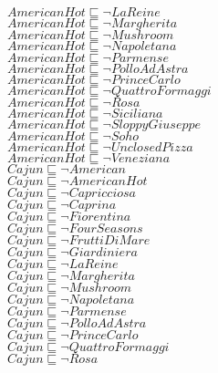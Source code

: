 \documentclass[a4paper,10pt]{article}
\begin{document}
 $AmericanHot \sqsubseteq  \lnot LaReine$\\ 
 $AmericanHot \sqsubseteq  \lnot Margherita$\\ 
 $AmericanHot \sqsubseteq  \lnot Mushroom$\\ 
 $AmericanHot \sqsubseteq  \lnot Napoletana$\\ 
 $AmericanHot \sqsubseteq  \lnot Parmense$\\ 
 $AmericanHot \sqsubseteq  \lnot PolloAdAstra$\\ 
 $AmericanHot \sqsubseteq  \lnot PrinceCarlo$\\ 
 $AmericanHot \sqsubseteq  \lnot QuattroFormaggi$\\ 
 $AmericanHot \sqsubseteq  \lnot Rosa$\\ 
 $AmericanHot \sqsubseteq  \lnot Siciliana$\\ 
 $AmericanHot \sqsubseteq  \lnot SloppyGiuseppe$\\ 
 $AmericanHot \sqsubseteq  \lnot Soho$\\ 
 $AmericanHot \sqsubseteq  \lnot UnclosedPizza$\\ 
 $AmericanHot \sqsubseteq  \lnot Veneziana$\\ 
 $Cajun \sqsubseteq  \lnot American$\\ 
 $Cajun \sqsubseteq  \lnot AmericanHot$\\ 
 $Cajun \sqsubseteq  \lnot Capricciosa$\\ 
 $Cajun \sqsubseteq  \lnot Caprina$\\ 
 $Cajun \sqsubseteq  \lnot Fiorentina$\\ 
 $Cajun \sqsubseteq  \lnot FourSeasons$\\ 
 $Cajun \sqsubseteq  \lnot FruttiDiMare$\\ 
 $Cajun \sqsubseteq  \lnot Giardiniera$\\ 
 $Cajun \sqsubseteq  \lnot LaReine$\\ 
 $Cajun \sqsubseteq  \lnot Margherita$\\ 
 $Cajun \sqsubseteq  \lnot Mushroom$\\ 
 $Cajun \sqsubseteq  \lnot Napoletana$\\ 
 $Cajun \sqsubseteq  \lnot Parmense$\\ 
 $Cajun \sqsubseteq  \lnot PolloAdAstra$\\ 
 $Cajun \sqsubseteq  \lnot PrinceCarlo$\\ 
 $Cajun \sqsubseteq  \lnot QuattroFormaggi$\\ 
 $Cajun \sqsubseteq  \lnot Rosa$\\ 
\end{document}
